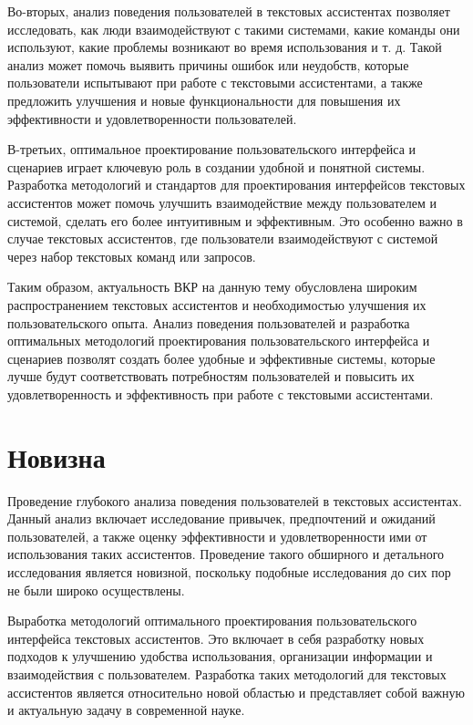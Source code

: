 \documentclass{article}
\begin{document}
Во-вторых, анализ поведения пользователей в текстовых ассистентах позволяет исследовать, как люди взаимодействуют с такими системами, какие команды они используют, какие проблемы возникают во время использования и т. д. Такой анализ может помочь выявить причины ошибок или неудобств, которые пользователи испытывают при работе с текстовыми ассистентами, а также предложить улучшения и новые функциональности для повышения их эффективности и удовлетворенности пользователей.

В-третьих, оптимальное проектирование пользовательского интерфейса и сценариев играет ключевую роль в создании удобной и понятной системы. Разработка методологий и стандартов для проектирования интерфейсов текстовых ассистентов может помочь улучшить взаимодействие между пользователем и системой, сделать его более интуитивным и эффективным. Это особенно важно в случае текстовых ассистентов, где пользователи взаимодействуют с системой через набор текстовых команд или запросов.

Таким образом, актуальность ВКР на данную тему обусловлена широким распространением текстовых ассистентов и необходимостью улучшения их пользовательского опыта. Анализ поведения пользователей и разработка оптимальных методологий проектирования пользовательского интерфейса и сценариев позволят создать более удобные и эффективные системы, которые лучше будут соответствовать потребностям пользователей и повысить их удовлетворенность и эффективность при работе с текстовыми ассистентами.
\section{Новизна}

Проведение глубокого анализа поведения пользователей в текстовых ассистентах. Данный анализ включает исследование привычек, предпочтений и ожиданий пользователей, а также оценку эффективности и удовлетворенности ими от использования таких ассистентов. Проведение такого обширного и детального исследования является новизной, поскольку подобные исследования до сих пор не были широко осуществлены.

Выработка методологий оптимального проектирования пользовательского интерфейса текстовых ассистентов. Это включает в себя разработку новых подходов к улучшению удобства использования, организации информации и взаимодействия с пользователем. Разработка таких методологий для текстовых ассистентов является относительно новой областью и представляет собой важную и актуальную задачу в современной науке.
\end{document}
